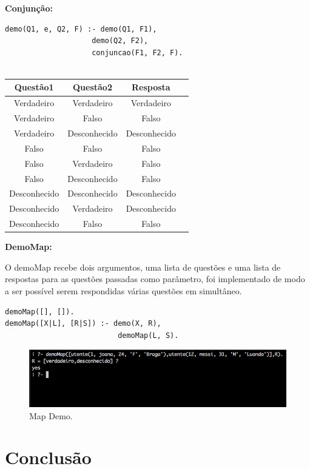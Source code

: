 \documentclass[25pt]{article}
\begin{document}
\textbf{Conjunção:}
\begin{lstlisting}
demo(Q1, e, Q2, F) :- demo(Q1, F1),
                    demo(Q2, F2),
                    conjuncao(F1, F2, F).


\end{lstlisting}

\begin{center}
\begin{tabular}{||c c c c||} 
\hline
Questão1 & Questão2 & Resposta \\ [0.5ex] 
 \hline\hline
 Verdadeiro & Verdadeiro & Verdadeiro \\ 
 \hline
 Verdadeiro & Falso & Falso \\
 \hline
 Verdadeiro & Desconhecido & Desconhecido\\
 \hline
  Falso & Falso & Falso \\
 \hline
  Falso & Verdadeiro & Falso \\
 \hline
  Falso & Desconhecido & Falso \\
 \hline
  Desconhecido & Desconhecido & Desconhecido \\
 \hline
  Desconhecido & Verdadeiro & Desconhecido \\
 \hline
  Desconhecido & Falso & Falso \\ [1ex] 
 \hline
\end{tabular} 
\end{center}

\textbf{DemoMap:}

O demoMap recebe dois argumentos, uma lista de questões e uma lista de respostas para as questões passadas como parâmetro, foi implementado de 
modo a ser possível serem respondidas várias questões em simultâneo.
\begin{lstlisting}
demoMap([], []).
demoMap([X|L], [R|S]) :- demo(X, R),
                          demoMap(L, S).
\end{lstlisting}
\begin{figure}[H]
\centering\includegraphics[scale=0.55]{demoMap}
\caption{\label{fig:controller}Map Demo.}
\end{figure}

\section{Conclusão}
\end{document}
